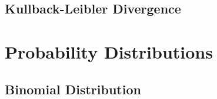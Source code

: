 \documentclass[11pt]{book}
\begin{document}
\section{Kullback-Leibler Divergence}




\chapter{Probability Distributions}

\section{Binomial Distribution}
\end{document}
